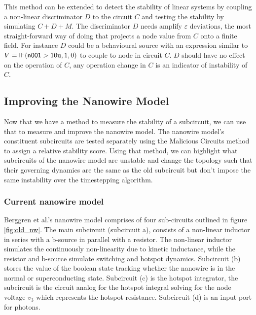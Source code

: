 This method can be extended to detect the stability of linear systems by coupling
a non-linear discriminator $D$ to the circuit $C$ and testing the stability by simulating
$C+D+M$. The discriminator $D$ needs amplify $\varepsilon$ deviations, the most straight-forward
way of doing that projects a node value from $C$ onto a finite field. For instance $D$ 
could be a behavioural source with an expression similar to $V=\textnormal{\textsf{IF}}(\textnormal{\textsf{n001}}>10\mathrm{u}, 1, 0)$ 
to couple to node  in circuit $C$. $D$ should have no effect on the operation of $C$,
any operation change in $C$ is an indicator of instability of $C$.



\subsection{Improving the Nanowire Model}

Now that we have a method to measure the stability of a subcircuit, we can use that
to measure and improve the nanowire model. The nanowire model's constituent subcircuits are
tested separately using the Malicious Circuits method to assign a relative stability
score. Using that method, we can highlight what subcircuits of the nanowire model are unstable 
and change the topology such that their governing dynamics are the same as the old subcircuit
but don't impose the same instability over the timestepping algorithm.

\subsubsection{Current nanowire model}
\label{current_nw}

Berggren et al.'s nanowire model comprises of four sub-circuits outlined in figure \ref{fig:old_nw}. The main subcircuit (subcircuit a), consists of a
non-linear inductor in series with a b-source in parallel with a resistor.
The non-linear inductor simulates the continuously non-linearity due to kinetic inductance,
while the resistor and b-source simulate switching and hotspot dynamics.
Subcircuit (b) stores the value of the boolean state tracking 
whether the nanowire is in the normal or superconducting state.
Subcircuit (c) is the hotspot integrator, the subcircuit is the
circuit analog for the hotspot integral solving for the node voltage $v_3$
which represents the hotspot resistance. Subcircuit (d) is an input port for
photons.

